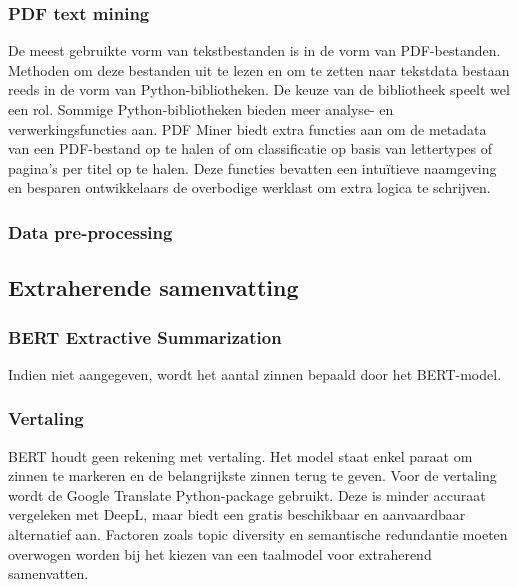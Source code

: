 \subsubsection{PDF text mining}

De meest gebruikte vorm van tekstbestanden is in de vorm van PDF-bestanden. Methoden om deze bestanden uit te lezen en om te zetten naar tekstdata bestaan reeds in de vorm van Python-bibliotheken. De keuze van de bibliotheek speelt wel een rol. Sommige Python-bibliotheken bieden meer analyse- en verwerkingsfuncties aan. PDF Miner biedt extra functies aan om de metadata van een PDF-bestand op te halen of om classificatie op basis van lettertypes of pagina's per titel op te halen. Deze functies bevatten een intuïtieve naamgeving en besparen ontwikkelaars de overbodige werklast om extra logica te schrijven.

\subsubsection{Data pre-processing}


\subsection{Extraherende samenvatting}

\subsubsection{BERT Extractive Summarization}

Indien niet aangegeven, wordt het aantal zinnen bepaald door het BERT-model.

\subsubsection{Vertaling}

BERT houdt geen rekening met vertaling. Het model staat enkel paraat om zinnen te markeren en de belangrijkste zinnen terug te geven. Voor de vertaling wordt de Google Translate Python-package gebruikt. Deze is minder accuraat vergeleken met DeepL, maar biedt een gratis beschikbaar en aanvaardbaar alternatief aan. Factoren zoals topic diversity en semantische redundantie moeten overwogen worden bij het kiezen van een taalmodel voor extraherend samenvatten.

